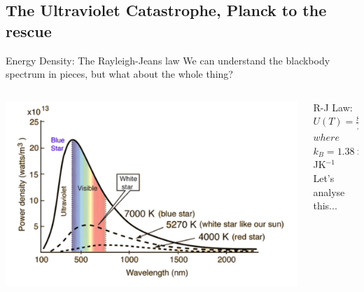 \subsection{The Ultraviolet Catastrophe, Planck to the rescue}
%
%
\begin{frame}{Energy Density: The Rayleigh-Jeans law}
\small
We can understand the blackbody spectrum in pieces, but what about the whole thing?\\[1ex]
\begin{columns}
\begin{column}{0.6\textwidth}

\includegraphics[scale=0.3]{bbspectrum}
\end{column}
\begin{column}{0.4\textwidth}
R-J Law: $U(T) = \frac{8\pi}{\lambda^4} k_B T$\\ [1ex]
$where$\\[1ex]
 $k_B = 1.38\times10^{-23}$ JK$^{-1}$\\[2ex]
Let's analyse this...\\[6ex]
\vspace{4cm}

\end{column}
\end{columns}
\end{frame}


